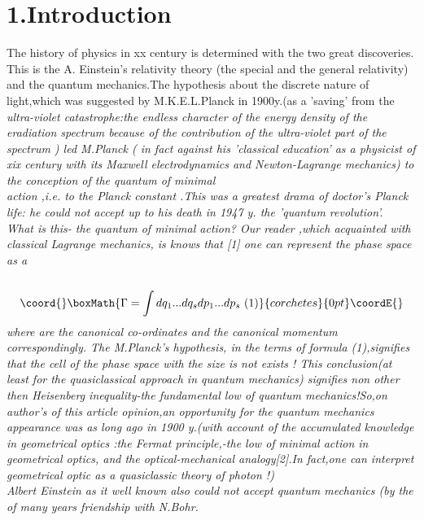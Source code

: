 \documentclass[a4paper,12pt] {article}
\begin{document}
\section* {1.Introduction}
The history of   physics in xx century is determined with the two great discoveries. This is the  A. Einstein's relativity theory
(the special and the general relativity) and the quantum mechanics.The hypothesis about the  discrete nature of light,which
was suggested by M.K.E.L.Planck in 1900y.(as a 'saving' from the \it  ultra-violet catastrophe\rm:the
 endless character of  the energy density of the eradiation spectrum
because of the contribution of the ultra-violet part of
the spectrum ) led M.Planck ( in fact against his 'classical education' as a physicist of xix century with its Maxwell electrodynamics and Newton-Lagrange mechanics) to the conception of  the \it quantum of minimal\\ action
\rm,i.e. to the Planck constant \myHighlight{$\hbar$}\coordHE{}  .This was a greatest drama of doctor's Planck life: he could not accept up to his death in 1947 y. the 'quantum revolution'.\\What is this- the quantum of minimal action? Our reader ,which acquainted with classical Lagrange  mechanics, is knows
that [1] one can represent  the phase space  \myHighlight{$ \Gamma$}\coordHE{}
  as a \\\
\begin{displaymath}\coord{}\boxMath{
 \Gamma =\int dq_ 1...dq_ sdp_1...dp_s\ (1)
}{corchetes}{0pt}\coordE{}\end{displaymath}
 where \coordHE{}  are the canonical co-ordinates and the canonical momentum correspondingly.
The M.Planck's hypothesis, in the terms of formula (1),signifies that \it the cell of the phase space with the size \coordHE{}\it  is not exists \rm! This conclusion(at least for the quasiclassical  approach in quantum mechanics)
 signifies non other then  \it Heisenberg inequality\rm -the fundamental low of quantum mechanics!So,on  author's of this article
opinion,an opportunity for  the quantum mechanics appearance was as long ago in 1900 y.(with account of the accumulated knowledge in geometrical optics
:the Fermat principle,-the low of minimal action in geometrical optics, and the optical-mechanical analogy[2].In fact,one can interpret  geometrical optic \it as a quasiclassic theory of photon \rm!)
\\ Albert Einstein as it well known also could not accept  quantum mechanics (by  the of many years friendship with N.Bohr.
\end{document}
